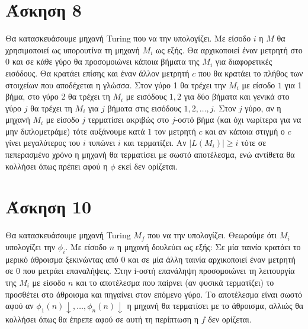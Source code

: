 \documentclass[11pt]{article}
\begin{document}
\section*{Άσκηση 8}
Θα κατασκευάσουμε μηχανή Turing που να την υπολογίζει. Με είσοδο $i$ η $M$ θα χρησιμοποιεί ως υπορουτίνα τη
μηχανή $M_i$ ως εξής. Θα αρχικοποιεί έναν μετρητή στο 0 και σε κάθε γύρο θα προσομοιώνει κάποια βήματα
της $M_i$ για διαφορετικές εισόδους. Θα κρατάει επίσης και έναν άλλον μετρητή $c$ που θα κρατάει το πλήθος 
των στοιχείων που αποδέχεται η γλώσσα. Στον γύρο 1 θα τρέχει την $M_i$ με είσοδο $1$ για 1 βήμα, στο 
γύρο 2 θα τρέχει τη $M_i$ με εισόδους $1,2$ για δύο βήματα και γενικά στο γύρο $j$ θα τρέχει τη $M_i$ για $j$ 
βήματα στις εισόδους $1,2,\ldots,j$. Στον $j$ γύρο, αν η μηχανή $M_i$ με είσοδο $j$ τερματίσει ακριβώς στο $j$-οστό
βήμα (και όχι νωρίτερα για να μην διπλομετράμε) τότε αυξάνουμε κατά $1$ τον μετρητή $c$ και αν κάποια στιγμή ο 
$c$ γίνει μεγαλύτερος του $i$ τυπώνει $i$ και τερματίζει. Αν $|L(M_i)|\geq i$ τότε σε πεπερασμένο χρόνο η μηχανή 
θα τερματίσει με σωστό αποτέλεσμα, ενώ αντίθετα θα κολλήσει όπως πρέπει αφού η $\phi$ εκεί δεν ορίζεται.




\section*{Άσκηση 10}
Θα κατασκευάσουμε μηχανή Turing $M_f$ που να την υπολογίζει. Θεωρούμε ότι $M_i$ υπολογίζει την $\phi_i$.
Με είσοδο $n$ η μηχανή δουλεύει ως εξής: Σε μία ταινία κρατάει το μερικό άθροισμα ξεκινώντας από 0 και σε μία
άλλη ταινία αρχικοποιεί έναν μετρητή σε 0 που μετράει επαναλήψεις. Στην i-οστή επανάληψη προσομοιώνει τη λειτουργία
της $M_i$ με είσοδο $n$ και το αποτέλεσμα που παίρνει (αν φυσικά τερματίζει) το προσθέτει στο άθροισμα και πηγαίνει στον
επόμενο γύρο. Το αποτέλεσμα είναι σωστό αφού αν $\phi_1(n)\downarrow,\ldots,\phi_n(n)\downarrow$ η μηχανή θα τερματίσει
με το άθροισμα, αλλιώς θα κολλήσει όπως θα έπρεπε αφού σε αυτή τη περίπτωση η $f$ δεν ορίζεται.

\end{document}
